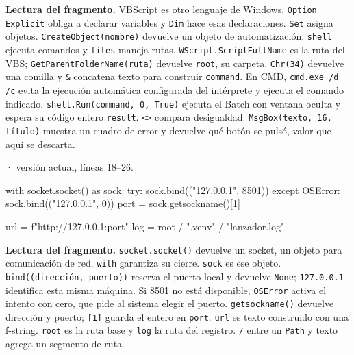 \documentclass[11pt,a4paper]{article}
\begin{document}
\textbf{Lectura del fragmento.} VBScript es otro lenguaje de Windows. \texttt{Option Explicit} obliga a declarar variables y \texttt{Dim} hace esas declaraciones. \texttt{Set} asigna objetos. \texttt{CreateObject(nombre)} devuelve un objeto de automatización: \texttt{shell} ejecuta comandos y \texttt{files} maneja rutas. \texttt{WScript.ScriptFullName} es la ruta del VBS; \texttt{GetParentFolderName(ruta)} devuelve \texttt{root}, su carpeta. \texttt{Chr(34)} devuelve una comilla y \texttt{\&} concatena texto para construir \texttt{command}. En CMD, \texttt{cmd.exe /d /c} evita la ejecución automática configurada del intérprete y ejecuta el comando indicado. \texttt{shell.Run(command, 0, True)} ejecuta el Batch con ventana oculta y espera su código entero \texttt{result}. \texttt{\textless{}\textgreater{}} compara desigualdad. \texttt{MsgBox(texto, 16, título)} muestra un cuadro de error y devuelve qué botón se pulsó, valor que aquí se descarta.


\smallskip
{\footnotesize\texttt{} · versión actual, líneas 18--26.}\par
\begin{Codigo}[firstnumber=18]
        with socket.socket() as sock:
            try:
                sock.bind(("127.0.0.1", 8501))
            except OSError:
                sock.bind(("127.0.0.1", 0))
            port = sock.getsockname()[1]

        url = f"http://127.0.0.1:{port}"
        log = root / ".venv" / "lanzador.log"
\end{Codigo}

\textbf{Lectura del fragmento.} \texttt{socket.socket()} devuelve un socket, un objeto para comunicación de red. \texttt{with} garantiza su cierre. \texttt{sock} es ese objeto. \texttt{bind((dirección, puerto))} reserva el puerto local y devuelve \texttt{None}; \texttt{127.0.0.1} identifica esta misma máquina. Si 8501 no está disponible, \texttt{OSError} activa el intento con cero, que pide al sistema elegir el puerto. \texttt{getsockname()} devuelve dirección y puerto; \texttt{[1]} guarda el entero en \texttt{port}. \texttt{url} es texto construido con una f-string. \texttt{root} es la ruta base y \texttt{log} la ruta del registro. \texttt{/} entre un \texttt{Path} y texto agrega un segmento de ruta.
\end{document}
